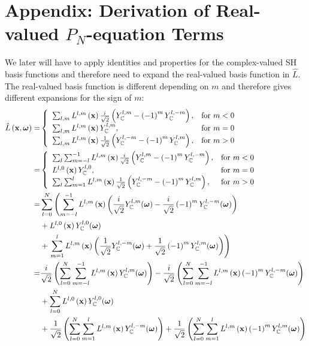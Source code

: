 \chapter{Appendix: Derivation of Real-valued $P_N$-equation Terms}
\label{app:rpn}


We later will have to apply identities and properties for the complex-valued SH basis functions and therefore need to expand the real-valued basis function in $\hat{L}$. The real-valued basis function is different depending on $m$ and therefore gives different expansions for the sign of $m$:
\begin{align}
\hat{L}\left(\boldsymbol{\mathbf{x}}, \boldsymbol{\mathbf{\omega}}\right)
=&
\left\{
\begin{array}{lr}
\sum_{l,m}L^{l,m}\left(\boldsymbol{\mathbf{x}}\right)\frac{{i\mkern1mu}}{\sqrt{2}}\left(Y_{\mathbb{C}}^{l,m}-\left(-1\right)^mY_{\mathbb{C}}^{l,-m}\right), & \text{for } m < 0\\
\sum_{l,m}L^{l,m}\left(\boldsymbol{\mathbf{x}}\right)Y_{\mathbb{C}}^{l,m}, & \text{for } m = 0\\
\sum_{l,m}L^{l,m}\left(\boldsymbol{\mathbf{x}}\right)\frac{1}{\sqrt{2}}\left(Y_{\mathbb{C}}^{l,-m}-\left(-1\right)^mY_{\mathbb{C}}^{l,m}\right), & \text{for } m > 0
\end{array}
\right.
\nonumber\\
=&
\left\{
\begin{array}{lr}
\sum_{l}\sum_{m=-l}^{-1}L^{l,m}\left(\boldsymbol{\mathbf{x}}\right)\frac{{i\mkern1mu}}{\sqrt{2}}\left(Y_{\mathbb{C}}^{l,m}-\left(-1\right)^mY_{\mathbb{C}}^{l,-m}\right), & \text{for } m < 0\\
L^{l,0}\left(\boldsymbol{\mathbf{x}}\right)Y_{\mathbb{C}}^{l,0}, & \text{for } m = 0\\
\sum_{l}\sum_{m=1}^{l}L^{l,m}\left(\boldsymbol{\mathbf{x}}\right)\frac{1}{\sqrt{2}}\left(Y_{\mathbb{C}}^{l,-m}-\left(-1\right)^mY_{\mathbb{C}}^{l,m}\right), & \text{for } m > 0
\end{array}
\right.
\nonumber\\
=&
\sum_{l=0}^{N}
\left(
\sum_{m=-l}^{-1}
{
L^{{l,m}}\left (\boldsymbol{\mathbf{x}} \right )\left(\frac{i}{\sqrt{2}}Y_{\mathbb{C}}^{l, m}(\boldsymbol{\mathbf{\omega}} )-\frac{i}{\sqrt{2}}\left({-1}\right)^{m}Y_{\mathbb{C}}^{l, -m}(\boldsymbol{\mathbf{\omega}} )\right)
}
\right.
\nonumber\\
&
+L^{l,0}\left (\boldsymbol{\mathbf{x}} \right )Y_{\mathbb{C}}^{l, 0}(\boldsymbol{\mathbf{\omega}} )
\nonumber\\
&
+
\left.
\sum_{m=1}^{l}
{
L^{{l,m}}\left (\boldsymbol{\mathbf{x}} \right )\left(\frac{1}{\sqrt{2}}Y_{\mathbb{C}}^{l, -m}(\boldsymbol{\mathbf{\omega}} )+\frac{1}{\sqrt{2}}\left({-1}\right)^{m}Y_{\mathbb{C}}^{l, m}(\boldsymbol{\mathbf{\omega}} )\right)
}
\right)
\nonumber\\=&
\frac{i}{\sqrt{2}}\left(\sum_{l=0}^{N}{\sum_{m=-l}^{-1}{L^{{l,m}}\left (\boldsymbol{\mathbf{x}} \right )Y_{\mathbb{C}}^{l, m}(\boldsymbol{\mathbf{\omega}} )}}\right)
-\frac{i}{\sqrt{2}}\left(\sum_{l=0}^{N}{\sum_{m=-l}^{-1}{L^{{l,m}}\left (\boldsymbol{\mathbf{x}} \right )\left({-1}\right)^{m}Y_{\mathbb{C}}^{l, -m}(\boldsymbol{\mathbf{\omega}} )}}\right)
\nonumber\\&
+\sum_{l=0}^{N}{L^{{l,0}}\left (\boldsymbol{\mathbf{x}} \right )Y_{\mathbb{C}}^{l, 0}(\boldsymbol{\mathbf{\omega}} )}
\nonumber\\&
+\frac{1}{\sqrt{2}}\left(\sum_{l=0}^{N}{\sum_{m=1}^{l}{L^{{l,m}}\left (\boldsymbol{\mathbf{x}} \right )Y_{\mathbb{C}}^{l, -m}(\boldsymbol{\mathbf{\omega}} )}}\right)
+\frac{1}{\sqrt{2}}\left(\sum_{l=0}^{N}{\sum_{m=1}^{l}{L^{{l,m}}\left (\boldsymbol{\mathbf{x}} \right )\left({-1}\right)^{m}Y_{\mathbb{C}}^{l, m}(\boldsymbol{\mathbf{\omega}} )}}\right)
\end{align}

